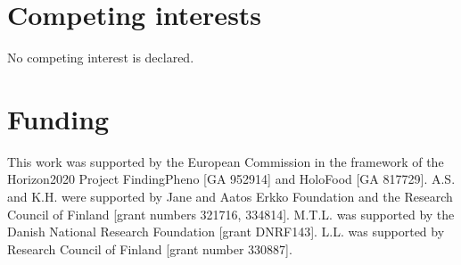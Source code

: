 \documentclass[unnumsec,webpdf,namedate,modern,large]{oup-authoring-template}%
\begin{document}
\section{Competing interests}
No competing interest is declared.

\section{Funding}
This work was supported by the European Commission in the framework of the Horizon2020 Project FindingPheno [GA  952914] and HoloFood [GA 817729]. A.S. and K.H. were  supported by Jane and Aatos Erkko Foundation and the Research Council of Finland [grant numbers 321716, 334814]. M.T.L. was supported by the Danish National Research Foundation [grant DNRF143].  L.L. was supported by Research Council of Finland [grant number 330887].

\printbibliography
\end{document}
